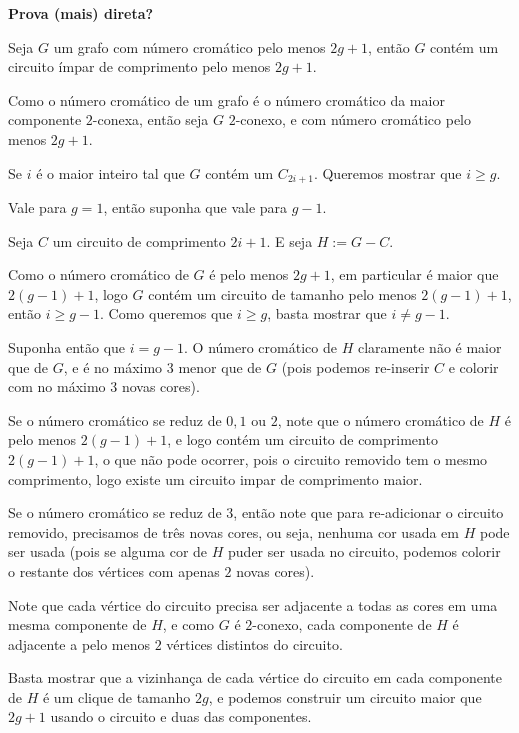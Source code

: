 \textbf{Prova (mais) direta?}

Seja $G$ um grafo com número cromático pelo menos $2g+1$, então $G$ contém um circuito ímpar de comprimento pelo menos $2g+1$.

Como o número cromático de um grafo é o número cromático da maior componente $2$-conexa, então seja $G$ $2$-conexo, e com número cromático pelo menos $2g+1$.

Se $i$ é o maior inteiro tal que $G$ contém um $C_{2i+1}$. Queremos mostrar que $i\geq g$.

Vale para $g=1$, então suponha que vale para $g-1$.

Seja $C$ um circuito de comprimento $2i+1$. E seja $H := G - C$. 

Como o número cromático de $G$ é pelo menos $2g+1$, em particular é maior que $2(g-1)+1$, logo $G$ contém um circuito de tamanho pelo menos $2(g-1)+1$, então $i\geq g-1$. Como queremos que $i \geq g$, basta mostrar que $i \neq g-1$.

Suponha então que $i = g-1$. O número cromático de $H$ claramente não é maior que de $G$, e é no máximo $3$ menor que de $G$ (pois podemos re-inserir $C$ e colorir com no máximo $3$ novas cores).

Se o número cromático se reduz de $0, 1$ ou $2$, note que o número cromático de $H$ é pelo menos $2(g-1)+1$, e logo contém um circuito de comprimento $2(g-1)+1$, o que não pode ocorrer, pois o circuito removido tem o mesmo comprimento, logo existe um circuito impar de comprimento maior.

Se o número cromático se reduz de $3$, então note que para re-adicionar o circuito removido, precisamos de três novas cores, ou seja, nenhuma cor usada em $H$ pode ser usada (pois se alguma cor de $H$ puder ser usada no circuito, podemos colorir o restante dos vértices com apenas $2$ novas cores).

Note que cada vértice do circuito precisa ser adjacente a todas as cores em uma mesma componente de $H$, e como $G$ é $2$-conexo, cada componente de $H$ é adjacente a pelo menos $2$ vértices distintos do circuito.

Basta mostrar que a vizinhança de cada vértice do circuito em cada componente de $H$ é um clique de tamanho $2g$, e podemos construir um circuito maior que $2g+1$ usando o circuito e duas das componentes. 